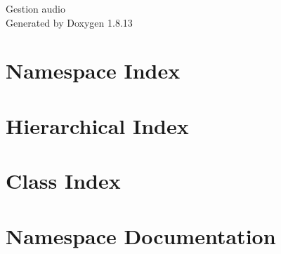 \documentclass[twoside]{book}
\newcommand{\+}{\discretionary{\mbox{\scriptsize$\hookleftarrow$}}{}{}}
\newcommand{\clearemptydoublepage}{%
  \newpage{\pagestyle{empty}\cleardoublepage}%
}
\begin{document}
\hypersetup{pageanchor=false,
             bookmarksnumbered=true,
             pdfencoding=unicode
            }
\begin{titlepage}
\vspace*{7cm}
\begin{center}%
{\Large Gestion audio }\\
\vspace*{1cm}
{\large Generated by Doxygen 1.8.13}\\
\end{center}
\end{titlepage}
\clearemptydoublepage
{}
\tableofcontents
\clearemptydoublepage
{}
\hypersetup{pageanchor=true}

\chapter{Namespace Index}

\chapter{Hierarchical Index}

\chapter{Class Index}

\chapter{Namespace Documentation}

















\end{document}
